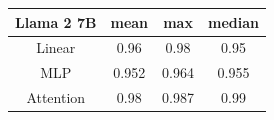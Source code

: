 \begin{tabular}{cccc}
    \toprule
    \textbf{Llama 2 7B} & mean & max & median \\
    \midrule
    Linear & 0.96 & 0.98 & 0.95 \\
    MLP & 0.952 & 0.964 & 0.955 \\
    Attention & 0.98 & 0.987 & 0.99 \\
    \bottomrule
\end{tabular}